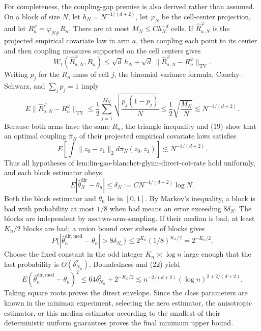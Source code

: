 For completeness, the coupling-gap premise is also derived rather than assumed.  On a block of size \(N\), let \(h_N=N^{-1/(d+2)}\), let \(\varphi_N\) be the cell-center projection, and let \(R_n^{\varphi}=\varphi_{N\#}R_n\).  There are at most \(M_N\le C h_N^{-d}\) cells.  If \(\widehat R_{a,N}^{\varphi}\) is the projected empirical covariate law in arm \(a\), then coupling each point to its center and then coupling measures supported on the cell centers gives
\[
W_1(\widehat R_{a,N}^{\varphi},R_n)
\le \sqrt d\,h_N+\sqrt d\,\|\widehat R_{a,N}^{\varphi}-R_n^{\varphi}\|_{\mathrm{TV}}.
\]
Writing \(p_j\) for the \(R_n\)-mass of cell \(j\), the binomial variance formula, Cauchy--Schwarz, and \(\sum_jp_j=1\) imply
\[
E\|\widehat R_{a,N}^{\varphi}-R_n^{\varphi}\|_{\mathrm{TV}}
\le\frac12\sum_{j=1}^{M_N}\sqrt{\frac{p_j(1-p_j)}N}
\le\frac12\sqrt{\frac{M_N}{N}}
\lesssim N^{-1/(d+2)}. \tag{19}
\]
Because both arms have the same \(R_n\), the triangle inequality and (19) show that an optimal coupling \(\widehat\pi_N\) of their projected empirical covariate laws satisfies
\[
E\!\left[\int\|z_0-z_1\|_2d\widehat\pi_N(z_0,z_1)\right]
\lesssim N^{-1/(d+2)}. \tag{20}
\]
Thus all hypotheses of \(\text{lem:lin-gao-blanchet-glynn-direct-cot-rate}\) hold uniformly, and each block estimator obeys
\[
E|\widehat\theta_{N}^{\mathrm{dir}}-\theta_n|
\le\delta_N:=C N^{-1/(d+2)}\log N. \tag{21}
\]
Both the block estimator and \(\theta_n\) lie in \([0,1]\).  By Markov's inequality, a block is bad with probability at most \(1/8\) when bad means an error exceeding \(8\delta_N\).  The blocks are independent by \(\text{ass:two-arm-sampling}\).  If their median is bad, at least \(K_n/2\) blocks are bad; a union bound over subsets of blocks gives
\[
P\{|\widehat\theta_n^{\mathrm{dir,med}}-\theta_n|>8\delta_{N_n}\}
\le2^{K_n}(1/8)^{K_n/2}=2^{-K_n/2}. \tag{22}
\]
Choose the fixed constant in the odd integer \(K_n\asymp\log n\) large enough that the last probability is \(O(\delta_{N_n}^2)\).  Boundedness and (22) yield
\[
E(\widehat\theta_n^{\mathrm{dir,med}}-\theta_n)^2
\le64\delta_{N_n}^2+2^{-K_n/2}
\lesssim n^{-2/(d+2)}(\log n)^{2+2/(d+2)}.
\]
Taking square roots proves the direct envelope.  Since the class parameters are known in the minimax experiment, selecting the zero estimator, the anisotropic estimator, or this median estimator according to the smallest of their deterministic uniform guarantees proves the final minimum upper bound.